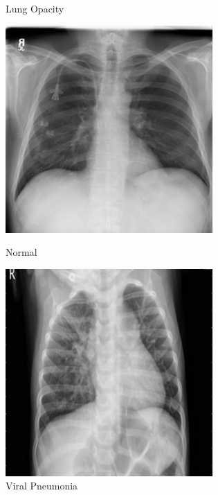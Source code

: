 \documentclass{article}
\begin{document}
\begin{figure}[H]
\begin{minipage}[t]{0.24\textwidth}
        \caption{Lung Opacity}
        \label{fig:LungOpacity-1005.png}
    \end{minipage}
    \begin{minipage}[t]{0.24\textwidth}
        \centering
        \includegraphics[width=\linewidth]{Normal-10023.png}
        \caption{Normal}
        \label{fig:Normal-10023.png}
    \end{minipage}
    \hfill
    \begin{minipage}[t]{0.24\textwidth}
        \centering
        \includegraphics[width=\linewidth]{ViralPneumonia-1020.png}
        \caption{Viral Pneumonia}
        \label{fig:ViralPneumonia-1020.png}
    \end{minipage}
\end{figure}
\end{document}
